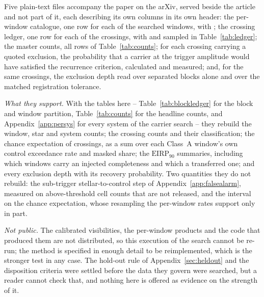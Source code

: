 Five plain-text files accompany the paper on the arXiv, served beside the
article and not part of it, each describing its own columns in its own header:
the per-window catalogue, one row for each of the \NWindows{} searched windows,
with \SiCatColList; the crossing ledger, one row for each of the
\EvNCrossRaw{} crossings, with \SiLdgColList{} and sampled in
Table~\ref{tab:ledger}; the master counts, all
\MtCountRows{} rows of Table~\ref{tab:counts}; for each crossing carrying
a quoted exclusion, the probability that a carrier at the trigger amplitude
would have satisfied the recurrence criterion, calculated and measured; and,
for the same crossings, the exclusion depth read over separated blocks alone
and over the matched registration tolerance.

\emph{What they support.} With the tables here -- Table~\ref{tab:blockledger}
for the block and window partition, Table~\ref{tab:counts} for the headline
counts, and Appendix~\ref{app:persys} for every system of the carrier search
-- they rebuild the window, star
and system counts; the crossing counts and their classification; the chance
expectation of \CeExp{} crossings, as a sum over each Class~A window's own
control exceedance rate and masked share; the $\mathrm{EIRP}_{90}$ summaries,
including which windows carry an injected completeness and which a transferred
one; and every exclusion depth with its recovery probability. Two quantities
they do not rebuild: the sub-trigger stellar-to-control step of
Appendix~\ref{app:falsealarm}, measured on above-threshold cell counts that are
not released, and the interval on the chance expectation, whose resampling the
per-window rates support only in part.

\emph{Not public.} The calibrated visibilities, the per-window products and the
code that produced them are not distributed, so this execution of the search
cannot be re-run; the method is specified in enough detail to be
reimplemented, which is the stronger test in any case. The hold-out rule of
Appendix~\ref{sec:heldout} and the disposition criteria were settled before the
data they govern were searched, but a reader cannot check that, and nothing
here is offered as evidence on the strength of it.
